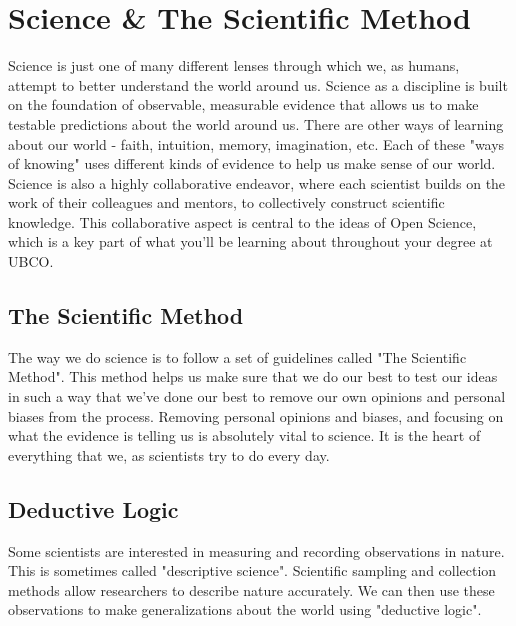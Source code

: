 \documentclass[
]{book}
\begin{document}
\hypertarget{science-the-scientific-method}{%
\section*{Science \& The Scientific Method}\label{science-the-scientific-method}}

Science is just one of many different lenses through which we, as humans, attempt to better understand the world around us. Science as a discipline is built on the foundation of observable, measurable evidence that allows us to make testable predictions about the world around us. There are other ways of learning about our world - faith, intuition, memory, imagination, etc. Each of these "ways of knowing" uses different kinds of evidence to help us make sense of our world. Science is also a highly collaborative endeavor, where each scientist builds on the work of their colleagues and mentors, to collectively construct scientific knowledge. This collaborative aspect is central to the ideas of Open Science, which is a key part of what you'll be learning about throughout your degree at UBCO.

\hypertarget{the-scientific-method}{%
\subsection*{The Scientific Method}\label{the-scientific-method}}

The way we do science is to follow a set of guidelines called "The Scientific Method". This method helps us make sure that we do our best to test our ideas in such a way that we've done our best to remove our own opinions and personal biases from the process. Removing personal opinions and biases, and focusing on what the evidence is telling us is absolutely vital to science. It is the heart of everything that we, as scientists try to do every day.

\hypertarget{deductive-logic}{%
\subsection*{Deductive Logic}\label{deductive-logic}}

Some scientists are interested in measuring and recording observations in nature. This is sometimes called "descriptive science". Scientific sampling and collection methods allow researchers to describe nature accurately. We can then use these observations to make generalizations about the world using "deductive logic".
\end{document}
